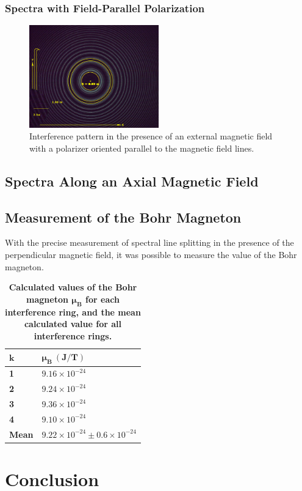\documentclass[twocolumn]{article}
\begin{document}
		\subsubsection{Spectra with Field-Parallel Polarization}
		\begin{figure}
			\centering
			\includegraphics[width=0.5\textwidth]{Images/Run2_PerpendicularPolarizer}
			\caption{Interference pattern in the presence of an external magnetic field with a polarizer oriented parallel to the magnetic field lines.}
			\label{fig:Run2_0Deg}
		\end{figure}

		
	\subsection{Spectra Along an Axial Magnetic Field}
	
	\subsection{Measurement of the Bohr Magneton} \label{subsec:BohrMagneton}
		With the precise measurement of spectral line splitting in the presence of the perpendicular magnetic field, it was possible to measure the value of the Bohr magneton.
		
		\begin{table}[]
			\centering
			\begin{tabular}{l|l}
				$\mathbf{k}$    & $\mathbf{\mu_B \ (J/T)}$ \\ \hline
				\textbf{1}    & $9.16\times10^{-24}$   \\
				\textbf{2}    & $9.24\times10^{-24}$   \\
				\textbf{3}    & $9.36\times10^{-24}$   \\
				\textbf{4}    & $9.10\times10^{-24}$   \\ \hline
				\textbf{Mean} & $9.22\times10^{-24}\pm0.6\times10^{-24}$  
			\end{tabular}
			\caption{\textbf{Calculated values of the Bohr magneton $\mathbf{\mu_B}$ for each interference ring, and the mean calculated value for all interference rings.}}
			\label{tab:BohrCalcs}
		\end{table}
	

\section{Conclusion} \label{sec:Conclusion}



\end{document}
